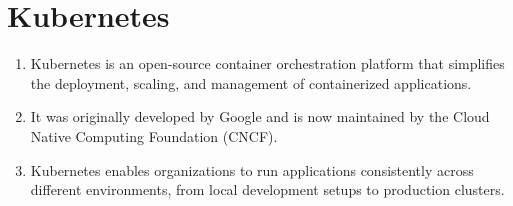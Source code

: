 \newpage

\section*{Kubernetes}

\begin{enumerate}
    \item Kubernetes is an open-source container orchestration platform that simplifies the deployment, scaling, and management of containerized applications.
    
    \item It was originally developed by Google and is now maintained by the Cloud Native Computing Foundation (CNCF).
    
    \item Kubernetes enables organizations to run applications consistently across different environments, from local development setups to production clusters.
\end{enumerate}

